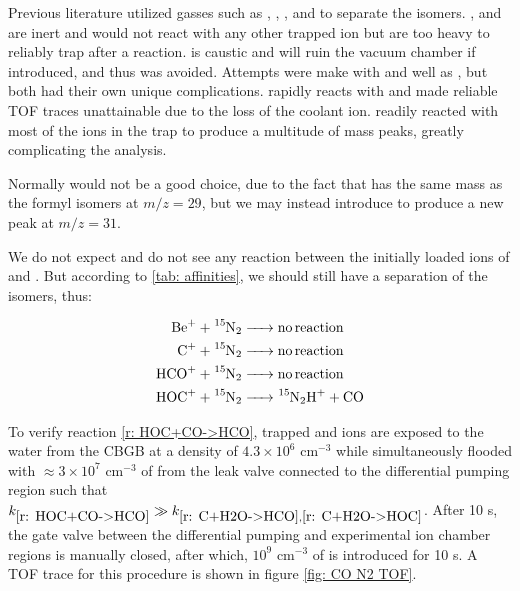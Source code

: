 Previous literature utilized gasses such as , , , and  to separate the isomers. , and  are inert and would not react with any other trapped ion but are too heavy to reliably trap after a reaction.  is caustic and will ruin the vacuum chamber if introduced, and thus was avoided. Attempts were make with  and well as , but both had their own unique complications.  rapidly reacts with  and made reliable TOF traces unattainable due to the loss of the coolant ion.  readily reacted with most of the ions in the trap to produce a multitude of mass peaks, greatly complicating the analysis.

Normally  would not be a good choice, due to the fact that  has the same mass as the formyl isomers at $m/z=29$, but we may instead introduce  to produce a new peak at $m/z=31$.

We do not expect and do not see any reaction between the initially loaded ions of  and . But according to \cref{tab: affinities}, we should still have a separation of the isomers, thus:

\begin{align}
	\ce{Be+ + ^15N2 & -> no reaction} \\
	\ce{C+ + ^15N2 & -> no reaction} \\
	\ce{HCO+ + ^15N2 & -> no reaction} \label{r: HCO+N2->NA} \\
	\ce{HOC+ + ^15N2 & -> ^15N2H+ + CO} \label{r: HOC+N2->N2H}
\end{align}

To verify reaction \ref{r: HOC+CO->HCO}, trapped  and  ions are exposed to the water from the CBGB at a density of $4.3 \times 10^6$ cm$^{-3}$ while simultaneously flooded with $\approx 3 \times 10^7$ cm$^{-3}$ of  from the leak valve connected to the differential pumping region such that $k_{\ref{r: HOC+CO->HCO}} \gg k_{\ref{r: C+H2O->HCO}, \ref{r: C+H2O->HOC}}$. After 10 s, the gate valve between the differential pumping and experimental ion chamber regions is manually closed, after which, $10^9$ cm$^{-3}$ of  is introduced for 10 s. A TOF trace for this procedure is shown in figure \ref{fig: CO N2 TOF}.

